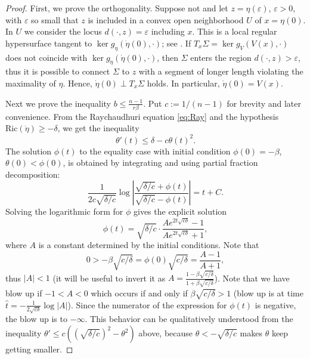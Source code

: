 \documentclass[a4paper,11pt]{article}
\numberwithin{equation}{section}
\theoremstyle{definition}
\theoremstyle{plain}
\newcommand{\eps}{\varepsilon}
\newcommand{\Ric}{\mathrm{Ric}}
\begin{document}
\begin{proof}
First, we prove the orthogonality. 
Suppose not and let $z=\eta(\eps)$, $\eps>0$, with $\eps$ so small that $z$ is included in a convex open neighborhood $U$ of $x=\eta(0)$.
In $U$ we consider the locus $d(\cdot,z)=\eps$ including $x$.
This is a local regular hypersurface tangent to $\ker g_{\dot{\eta}}(\dot{\eta}(0),\cdot)$; see \cite[Eq.\ (13)]{MinguzziConvexneighborhoods}.
If $T_x\Sigma=\ker g_V(V(x),\cdot)$ does not coincide with $\ker g_{\dot{\eta}}(\dot{\eta}(0),\cdot)$, then $\Sigma$ enters the region $d(\cdot,z)>\eps$, thus it is possible to connect $\Sigma$ to $z$ with a segment of longer length violating the maximality of $\eta$.
Hence, $\dot{\eta}(0) \perp T_x\Sigma$ holds.
In particular, $\dot{\eta}(0)=V(x)$.

Next we prove the inequality $b \le\frac{n-1}{r\beta}$. 
Put $c:=1/(n-1)$ for brevity and later convenience. 
From the Raychaudhuri equation \eqref{eq:Ray} and the hypothesis $\Ric(\dot{\eta}) \ge -\delta$, we get the inequality 
\begin{equation}\label{eq:Ray-ineq}
\theta'(t) \leq \delta - c\theta(t)^2.
\end{equation}
The solution $\phi(t)$ to the equality case with initial condition $\phi(0)=-\beta$, $\theta(0)<\phi(0)$, is obtained by integrating and using partial fraction decomposition:
\[
\frac{1}{2c\sqrt{\delta/c}}\log \left|\frac{\sqrt{\delta/c}+\phi(t)}{\sqrt{\delta/c}-\phi(t)}\right|=t+C .
\]
Solving  the logarithmic form for \(\phi\) gives the explicit solution
\[
\phi (t)=\sqrt{\delta/c} \cdot \frac{Ae^{2t\sqrt{c\delta}}-1}{Ae^{2t\sqrt{c\delta}}+1},
\]
where $A$ is a constant determined by the initial conditions. 
Note that 
\[
0 > -\beta\sqrt{c/\delta} =\phi(0)\sqrt{c/\delta} =\frac{A-1}{A+1}, 
\]
thus $\vert A\vert<1$ (it will be useful to invert it as $A=\frac{1-\beta\sqrt{c/\delta}}{1+\beta\sqrt{c/\delta}}$). 
Note that we have blow up if $-1<A<0$ which occurs if and only if $ \beta\sqrt{c/\delta}>1$ (blow up is at time $\hat t=- \frac{1}{2\sqrt{c\delta}} \log \vert A\vert$). Since the numerator of the expression for $\phi(t)$ is negative, the blow up is to $-\infty$.
This behavior can be qualitatively understood from the inequality $\theta' \leq c((\sqrt{\delta/c})^2 - \theta^2)$ above, because $\theta<-\sqrt{\delta/c}$ makes $\theta$ keep getting smaller.


\end{proof}
\end{document}
